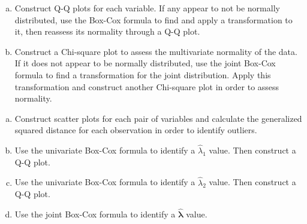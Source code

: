 \documentclass[12pt]{article}\usepackage[]{graphicx}\usepackage[]{color}
\newenvironment{problem}[2][Problem]{\begin{trivlist}
\item[\hskip \labelsep {\bfseries #1}\hskip \labelsep {\bfseries #2.}]}{\end{trivlist}}
\newcommand{\vct}{\mathbf}
\begin{document}

\begin{problem}{4.39(a)(b)}
\end{problem}

\begin{enumerate}[a)]

\item Construct Q-Q plots for each variable. If any appear to not be normally distributed, use the Box-Cox formula to find and apply a transformation to it, then reassess its normality through a Q-Q plot.

\item Construct a Chi-square plot to assess the multivariate normality of the data. If it does not appear to be normally distributed, use the joint Box-Cox formula to find a transformation for the joint distribution. Apply this transformation and construct another Chi-square plot in order to assess normality.

\end{enumerate}


\begin{problem}{4.40}
\end{problem}

\begin{enumerate}[a)]

\item Construct scatter plots for each pair of variables and calculate the generalized squared distance for each observation in order to identify outliers.

\item Use the univariate Box-Cox formula to identify a $\hat{\lambda}_1$ value. Then construct a Q-Q plot.

\item Use the univariate Box-Cox formula to identify a $\hat{\lambda}_2$ value. Then construct a Q-Q plot.

\item Use the joint Box-Cox formula to identify a $\vct{\hat{\lambda}}$ value.

\end{enumerate}

\end{document}
